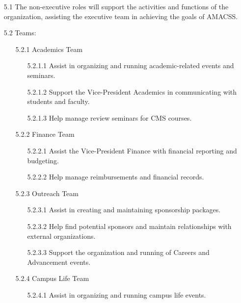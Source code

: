\documentclass[12pt,a4paper]{article}
\begin{document}
\begin{enumerate}
\item[5.1] The non-executive roles will support the activities and functions of the organization, assisting the executive team in achieving the goals of AMACSS.

\item[5.2] Teams:

\begin{enumerate}
\item[5.2.1] Academics Team

\begin{enumerate}
\item[5.2.1.1] Assist in organizing and running academic-related events and seminars.

\item[5.2.1.2] Support the Vice-President Academics in communicating with students and faculty.

\item[5.2.1.3] Help manage review seminars for CMS courses.
\end{enumerate}

\item[5.2.2] Finance Team

\begin{enumerate}
\item[5.2.2.1] Assist the Vice-President Finance with financial reporting and budgeting.

\item[5.2.2.2] Help manage reimbursements and financial records.
\end{enumerate}

\item[5.2.3] Outreach Team

\begin{enumerate}
\item[5.2.3.1] Assist in creating and maintaining sponsorship packages.

\item[5.2.3.2] Help find potential sponsors and maintain relationships with external organizations.

\item[5.2.3.3] Support the organization and running of Careers and Advancement events.
\end{enumerate}

\item[5.2.4] Campus Life Team

\begin{enumerate}
\item[5.2.4.1] Assist in organizing and running campus life events.


\end{enumerate}
\end{enumerate}
\end{enumerate}
\end{document}
